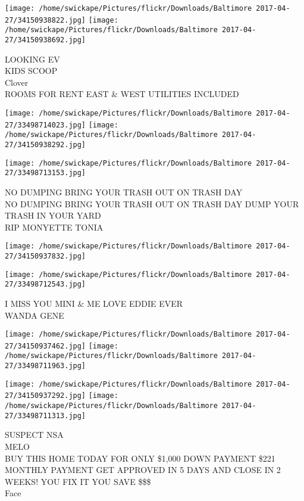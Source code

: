 \documentclass[10pt,letterpaper]{article}
\begin{document}
\texttt{[image: /home/swickape/Pictures/flickr/Downloads/Baltimore 2017-04-27/34150938822.jpg]}
\texttt{[image: /home/swickape/Pictures/flickr/Downloads/Baltimore 2017-04-27/34150938692.jpg]}

LOOKING EV\\
KIDS SCOOP\\
Clover\\
ROOMS FOR RENT EAST \& WEST UTILITIES INCLUDED
\pagebreak

\texttt{[image: /home/swickape/Pictures/flickr/Downloads/Baltimore 2017-04-27/33498714023.jpg]}
\texttt{[image: /home/swickape/Pictures/flickr/Downloads/Baltimore 2017-04-27/34150938292.jpg]}

\vspace{0.25in}
\texttt{[image: /home/swickape/Pictures/flickr/Downloads/Baltimore 2017-04-27/33498713153.jpg]}

NO DUMPING BRING YOUR TRASH OUT ON TRASH DAY\\
NO DUMPING BRING YOUR TRASH OUT ON TRASH DAY DUMP YOUR TRASH IN YOUR YARD\\
RIP MONYETTE TONIA
\pagebreak

\texttt{[image: /home/swickape/Pictures/flickr/Downloads/Baltimore 2017-04-27/34150937832.jpg]}

\vspace{0.25in}
\texttt{[image: /home/swickape/Pictures/flickr/Downloads/Baltimore 2017-04-27/33498712543.jpg]}

I MISS YOU MINI \& ME LOVE EDDIE EVER\\
WANDA GENE
\pagebreak

\texttt{[image: /home/swickape/Pictures/flickr/Downloads/Baltimore 2017-04-27/34150937462.jpg]}
\texttt{[image: /home/swickape/Pictures/flickr/Downloads/Baltimore 2017-04-27/33498711963.jpg]}

\texttt{[image: /home/swickape/Pictures/flickr/Downloads/Baltimore 2017-04-27/34150937292.jpg]}
\texttt{[image: /home/swickape/Pictures/flickr/Downloads/Baltimore 2017-04-27/33498711313.jpg]}

SUSPECT NSA\\
MELO\\
BUY THIS HOME TODAY FOR ONLY \$1,000 DOWN PAYMENT \$221 MONTHLY PAYMENT GET APPROVED IN 5 DAYS AND CLOSE IN 2 WEEKS!  YOU FIX IT YOU SAVE \$\$\$\\
Face
\pagebreak
\end{document}

